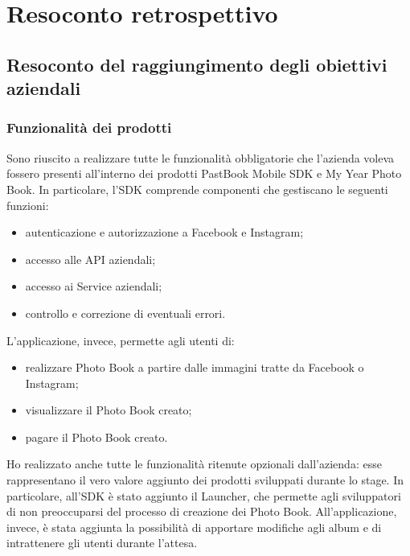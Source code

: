 \chapter{Resoconto retrospettivo}
	\section{Resoconto del raggiungimento degli obiettivi aziendali}
		\subsection{Funzionalità dei prodotti}
			Sono riuscito a realizzare tutte le funzionalità obbligatorie che l'azienda voleva fossero presenti all'interno dei prodotti
			PastBook Mobile SDK e My Year Photo Book. In particolare, l'SDK comprende componenti che gestiscano le seguenti funzioni:
			\begin{itemize}
				\item autenticazione e autorizzazione a Facebook e Instagram;
				\item accesso alle API aziendali;
				\item accesso ai Service aziendali;
				\item controllo e correzione di eventuali errori.
			\end{itemize}
			L'applicazione, invece, permette agli utenti di:
			\begin{itemize}
				\item realizzare Photo Book a partire dalle immagini tratte da Facebook o Instagram;
				\item visualizzare il Photo Book creato;
				\item pagare il Photo Book creato.
			\end{itemize}
			Ho realizzato anche tutte le funzionalità ritenute opzionali dall'azienda: esse rappresentano il vero valore aggiunto dei
			prodotti sviluppati durante lo stage. In particolare, all'SDK è stato aggiunto il Launcher, che permette agli sviluppatori di
			non preoccuparsi del processo di creazione dei Photo Book. All'applicazione, invece, è stata aggiunta la possibilità di
			apportare modifiche agli album e di intrattenere gli utenti durante l'attesa.
